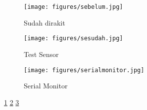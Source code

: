 		\begin{figure}[ht]
			\centerline{\texttt{[image: figures/sebelum.jpg]}}
			\caption{Sudah dirakit}
			\label{sebelum}
			\end{figure}
			
		\begin{figure}[ht]
			\centerline{\texttt{[image: figures/sesudah.jpg]}}
			\caption{Test Sensor}
			\label{sesudah}
			\end{figure}
		
		\begin{figure}[ht]
			\centerline{\texttt{[image: figures/serialmonitor.jpg]}}
			\caption{Serial Monitor}
			\label{serialmonitor}
			\end{figure}
			
	\ref{sebelum}
	\ref{sesudah}
	\ref{serialmonitor}
	
	\cite{olberding2013cuttable}
